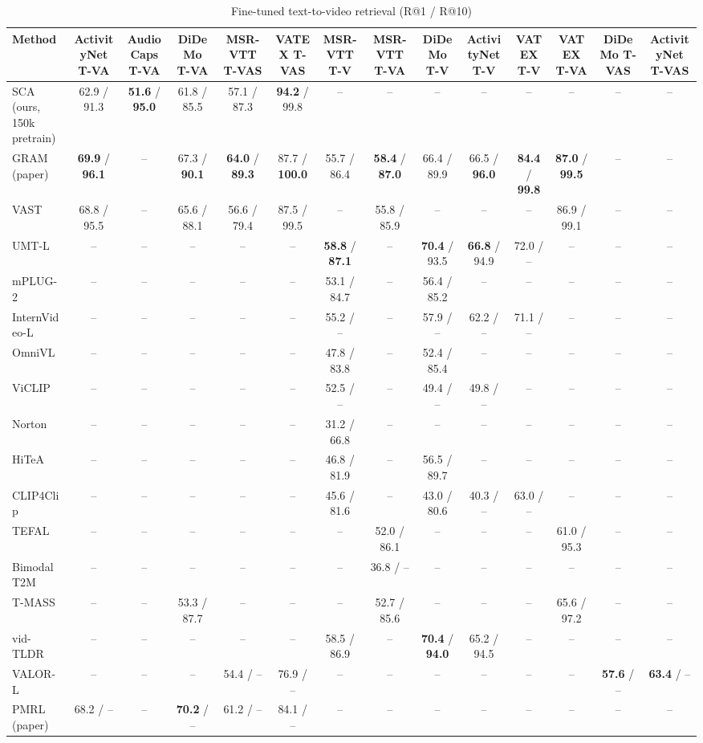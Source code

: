 \begin{table}[t]
\centering
\caption{Fine-tuned text-to-video retrieval (R@1 / R@10)}
\label{tab:finetune_t2v}
\small
\begin{tabular}{lccccccccccccc}
\toprule
Method & ActivityNet T-VA & AudioCaps T-VA & DiDeMo T-VA & MSR-VTT T-VAS & VATEX T-VAS & MSR-VTT T-V & MSR-VTT T-VA & DiDeMo T-V & ActivityNet T-V & VATEX T-V & VATEX T-VA & DiDeMo T-VAS & ActivityNet T-VAS \\
\midrule
SCA (ours, 150k pretrain) & 62.9 / 91.3 & \textbf{51.6} / \textbf{95.0} & 61.8 / 85.5 & 57.1 / 87.3 & \textbf{94.2} / 99.8 & -- & -- & -- & -- & -- & -- & -- & -- \\
GRAM (paper) & \textbf{69.9} / \textbf{96.1} & -- & 67.3 / \textbf{90.1} & \textbf{64.0} / \textbf{89.3} & 87.7 / \textbf{100.0} & 55.7 / 86.4 & \textbf{58.4} / \textbf{87.0} & 66.4 / 89.9 & 66.5 / \textbf{96.0} & \textbf{84.4} / \textbf{99.8} & \textbf{87.0} / \textbf{99.5} & -- & -- \\
VAST & 68.8 / 95.5 & -- & 65.6 / 88.1 & 56.6 / 79.4 & 87.5 / 99.5 & -- & 55.8 / 85.9 & -- & -- & -- & 86.9 / 99.1 & -- & -- \\
UMT-L & -- & -- & -- & -- & -- & \textbf{58.8} / \textbf{87.1} & -- & \textbf{70.4} / 93.5 & \textbf{66.8} / 94.9 & 72.0 / -- & -- & -- & -- \\
mPLUG-2 & -- & -- & -- & -- & -- & 53.1 / 84.7 & -- & 56.4 / 85.2 & -- & -- & -- & -- & -- \\
InternVideo-L & -- & -- & -- & -- & -- & 55.2 / -- & -- & 57.9 / -- & 62.2 / -- & 71.1 / -- & -- & -- & -- \\
OmniVL & -- & -- & -- & -- & -- & 47.8 / 83.8 & -- & 52.4 / 85.4 & -- & -- & -- & -- & -- \\
ViCLIP & -- & -- & -- & -- & -- & 52.5 / -- & -- & 49.4 / -- & 49.8 / -- & -- & -- & -- & -- \\
Norton & -- & -- & -- & -- & -- & 31.2 / 66.8 & -- & -- & -- & -- & -- & -- & -- \\
HiTeA & -- & -- & -- & -- & -- & 46.8 / 81.9 & -- & 56.5 / 89.7 & -- & -- & -- & -- & -- \\
CLIP4Clip & -- & -- & -- & -- & -- & 45.6 / 81.6 & -- & 43.0 / 80.6 & 40.3 / -- & 63.0 / -- & -- & -- & -- \\
TEFAL & -- & -- & -- & -- & -- & -- & 52.0 / 86.1 & -- & -- & -- & 61.0 / 95.3 & -- & -- \\
Bimodal T2M & -- & -- & -- & -- & -- & -- & 36.8 / -- & -- & -- & -- & -- & -- & -- \\
T-MASS & -- & -- & 53.3 / 87.7 & -- & -- & -- & 52.7 / 85.6 & -- & -- & -- & 65.6 / 97.2 & -- & -- \\
vid-TLDR & -- & -- & -- & -- & -- & 58.5 / 86.9 & -- & \textbf{70.4} / \textbf{94.0} & 65.2 / 94.5 & -- & -- & -- & -- \\
VALOR-L & -- & -- & -- & 54.4 / -- & 76.9 / -- & -- & -- & -- & -- & -- & -- & \textbf{57.6} / -- & \textbf{63.4} / -- \\
PMRL (paper) & 68.2 / -- & -- & \textbf{70.2} / -- & 61.2 / -- & 84.1 / -- & -- & -- & -- & -- & -- & -- & -- & -- \\
\bottomrule
\end{tabular}
\end{table}
